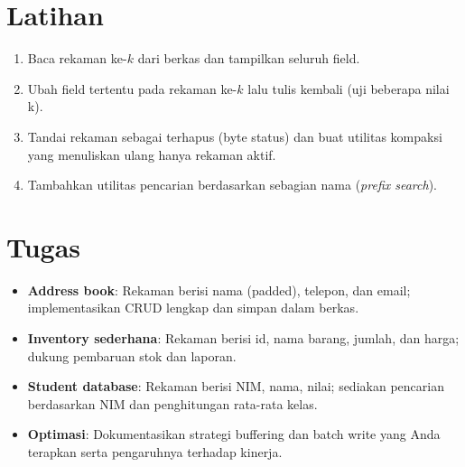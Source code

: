 \section{Latihan}
\begin{enumerate}
  \item Baca rekaman ke-\(k\) dari berkas dan tampilkan seluruh field.
  \item Ubah field tertentu pada rekaman ke-\(k\) lalu tulis kembali (uji beberapa nilai k).
  \item Tandai rekaman sebagai terhapus (byte status) dan buat utilitas kompaksi yang menuliskan ulang hanya rekaman aktif.
  \item Tambahkan utilitas pencarian berdasarkan sebagian nama (\textit{prefix search}).
\end{enumerate}

\section{Tugas}
\begin{itemize}
  \item \textbf{Address book}: Rekaman berisi nama (padded), telepon, dan email; implementasikan CRUD lengkap dan simpan dalam berkas.
  \item \textbf{Inventory sederhana}: Rekaman berisi id, nama barang, jumlah, dan harga; dukung pembaruan stok dan laporan.
  \item \textbf{Student database}: Rekaman berisi NIM, nama, nilai; sediakan pencarian berdasarkan NIM dan penghitungan rata-rata kelas.
  \item \textbf{Optimasi}: Dokumentasikan strategi buffering dan batch write yang Anda terapkan serta pengaruhnya terhadap kinerja.
\end{itemize}

